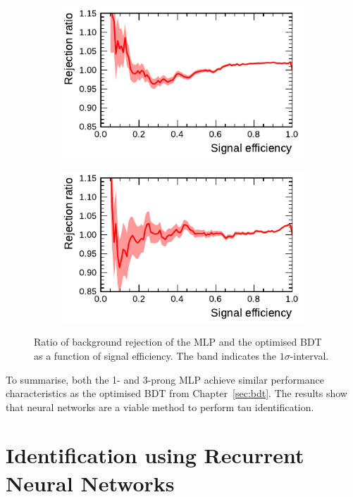 \begin{figure}[htb]
  \begin{subfigure}[t]{0.48\textwidth}
    \centering
    \includegraphics{./figures/rnn/mlp/mlp_bdt_ratio_1p.pdf}
  \end{subfigure}\hfill
  \begin{subfigure}[t]{0.48\textwidth}
    \centering
    \includegraphics{./figures/rnn/mlp/mlp_bdt_ratio_3p.pdf}
  \end{subfigure}
  \caption{Ratio of background rejection of the MLP and the optimised BDT as a
    function of signal efficiency. The band indicates the $1\sigma$-interval.}
  \label{fig:roc_mlp_bdt_comparison}
\end{figure}

To summarise, both the 1- and 3-prong MLP achieve similar performance
characteristics as the optimised BDT from Chapter~\ref{sec:bdt}. The results
show that neural networks are a viable method to perform tau identification.

\section{Identification using Recurrent Neural Networks}
\label{sec:rnn_id}

